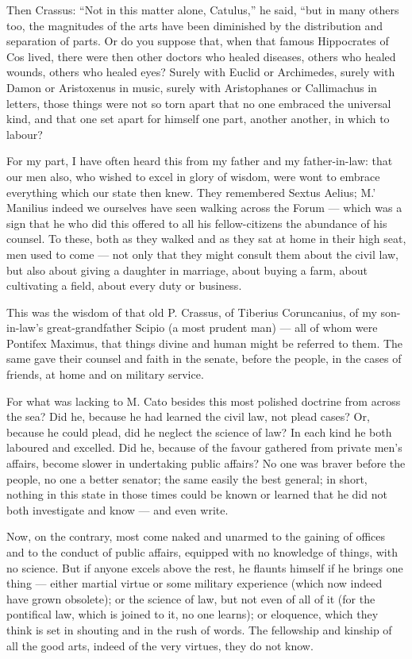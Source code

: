  Then Crassus: ``Not in this matter alone, Catulus,'' he said, ``but in many others too, the magnitudes of the arts have been diminished by the distribution and separation of parts. Or do you suppose that, when that famous Hippocrates of Cos lived, there were then other doctors who healed diseases, others who healed wounds, others who healed eyes? Surely with Euclid or Archimedes, surely with Damon or Aristoxenus in music, surely with Aristophanes or Callimachus in letters, those things were not so torn apart that no one embraced the universal kind, and that one set apart for himself one part, another another, in which to labour?

 For my part, I have often heard this from my father and my father-in-law: that our men also, who wished to excel in glory of wisdom, were wont to embrace everything which our state then knew. They remembered Sextus Aelius; M.' Manilius indeed we ourselves have seen walking across the Forum — which was a sign that he who did this offered to all his fellow-citizens the abundance of his counsel. To these, both as they walked and as they sat at home in their high seat, men used to come — not only that they might consult them about the civil law, but also about giving a daughter in marriage, about buying a farm, about cultivating a field, about every duty or business.

 This was the wisdom of that old P. Crassus, of Tiberius Coruncanius, of my son-in-law's great-grandfather Scipio (a most prudent man) — all of whom were Pontifex Maximus, that things divine and human might be referred to them. The same gave their counsel and faith in the senate, before the people, in the cases of friends, at home and on military service.

 For what was lacking to M. Cato besides this most polished doctrine from across the sea? Did he, because he had learned the civil law, not plead cases? Or, because he could plead, did he neglect the science of law? In each kind he both laboured and excelled. Did he, because of the favour gathered from private men's affairs, become slower in undertaking public affairs? No one was braver before the people, no one a better senator; the same easily the best general; in short, nothing in this state in those times could be known or learned that he did not both investigate and know — and even write.

 Now, on the contrary, most come naked and unarmed to the gaining of offices and to the conduct of public affairs, equipped with no knowledge of things, with no science. But if anyone excels above the rest, he flaunts himself if he brings one thing — either martial virtue or some military experience (which now indeed have grown obsolete); or the science of law, but not even of all of it (for the pontifical law, which is joined to it, no one learns); or eloquence, which they think is set in shouting and in the rush of words. The fellowship and kinship of all the good arts, indeed of the very virtues, they do not know.

